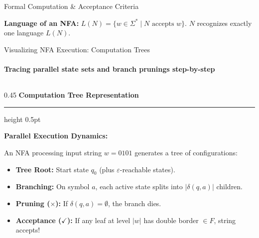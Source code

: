 \documentclass[aspectratio=169, 10pt]{beamer}
\newcommand{\colheader}[1]{%
  {\noindent\footnotesize\bfseries\color{gimpanavy}#1}%
  \vspace{0.02cm}%
  {\color{gimpanavy!30}\hrule height 0.5pt}%
  \vspace{0.05cm}%
}
\newcommand{\cardtitle}[1]{{\noindent\footnotesize\bfseries\color{gimpanavy}#1}\par\vspace{0.03cm}}
\begin{document}
\begin{frame}{Formal Computation \& Acceptance Criteria}
  \vspace{0.02cm}
  \begin{tcolorbox}[spotlightcard]
    {\scriptsize\textbf{Language of an NFA:} $L(N) = \{w \in \Sigma^* \mid N \text{ accepts } w\}$. $N$ recognizes exactly one language $L(N)$.}
  \end{tcolorbox}
\end{frame}

\begin{frame}{Visualizing NFA Execution: Computation Trees}
  \framesubtitle{Tracing parallel state sets and branch prunings step-by-step}
  
  \begin{columns}[T]
    \begin{column}{0.45\textwidth}
      \colheader{Computation Tree Representation}
      \begin{tcolorbox}[conceptcard]
        \cardtitle{Parallel Execution Dynamics:}
        {\scriptsize
        An NFA processing input string $w = 0101$ generates a tree of configurations:
        \begin{itemize}\setlength{\itemsep}{1.5pt}\scriptsize
          \item \textbf{Tree Root:} Start state $q_0$ (plus $\varepsilon$-reachable states).
          \item \textbf{Branching:} On symbol $a$, each active state splits into $|\delta(q, a)|$ children.
          \item \textbf{Pruning ($\times$):} If $\delta(q, a) = \emptyset$, the branch dies.
          \item \textbf{Acceptance ($\checkmark$):} If any leaf at level $|w|$ has double border $\in F$, string accepts!
        \end{itemize}
        }
      \end{tcolorbox}
    \end{column}
    

\end{columns}
\end{frame}
\end{document}
